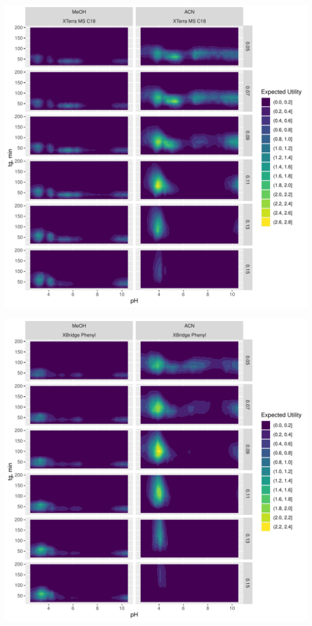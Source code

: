 \documentclass[
]{article}
\begin{document}
\newpage{}

\includegraphics{../figures/casestudy2/utilitymap/utilitymap2.pdf}

\includegraphics{../figures/casestudy2/utilitymap/utilitymap3.pdf}
\end{document}
